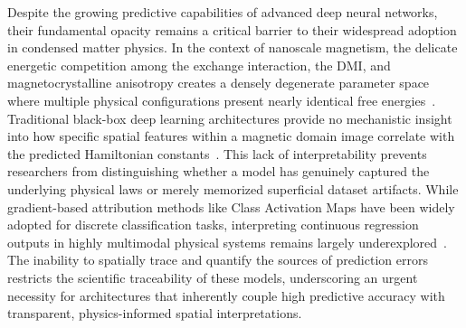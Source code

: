 \documentclass[final,5p,times,twocolumn]{elsarticle}
\begin{document}
Despite the growing predictive capabilities of advanced deep neural networks, their fundamental opacity remains a critical barrier to their widespread adoption in condensed matter physics. In the context of nanoscale magnetism, the delicate energetic competition among the exchange interaction, the DMI, and magnetocrystalline anisotropy creates a densely degenerate parameter space where multiple physical configurations present nearly identical free energies~\cite{vcadevz2026neural, will2021application}. Traditional black-box deep learning architectures provide no mechanistic insight into how specific spatial features within a magnetic domain image correlate with the predicted Hamiltonian constants~\cite{wang2021learning, sridharan2022modern}. This lack of interpretability prevents researchers from distinguishing whether a model has genuinely captured the underlying physical laws or merely memorized superficial dataset artifacts. While gradient-based attribution methods like Class Activation Maps have been widely adopted for discrete classification tasks, interpreting continuous regression outputs in highly multimodal physical systems remains largely underexplored~\cite{he2022survey}. The inability to spatially trace and quantify the sources of prediction errors restricts the scientific traceability of these models, underscoring an urgent necessity for architectures that inherently couple high predictive accuracy with transparent, physics-informed spatial interpretations.
\end{document}
